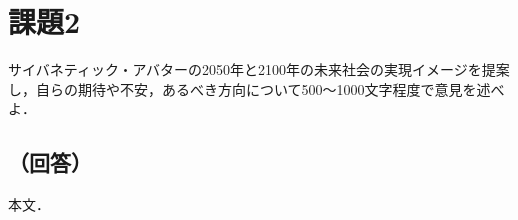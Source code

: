 \section*{課題2}
サイバネティック・アバターの2050年と2100年の未来社会の実現イメージを提案し，自らの期待や不安，あるべき方向について500～1000文字程度で意見を述べよ．

\subsection*{（回答）}
本文．
